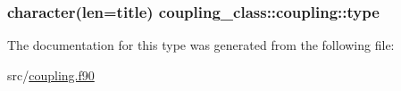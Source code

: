 \hypertarget{structcoupling__class_1_1coupling_a74b13fd447f07c24380e3913fd06d545}{
\subsubsection[{type}]{\setlength{\rightskip}{0pt plus 5cm}character(len=title) coupling\-\_\-class\-::coupling\-::type\hspace{0.3cm}{\ttfamily [private]}}}\label{structcoupling__class_1_1coupling_a74b13fd447f07c24380e3913fd06d545}


The documentation for this type was generated from the following file\-:\begin{DoxyCompactItemize}
\item 
src/\hyperlink{coupling_8f90}{coupling.\-f90}\end{DoxyCompactItemize}
